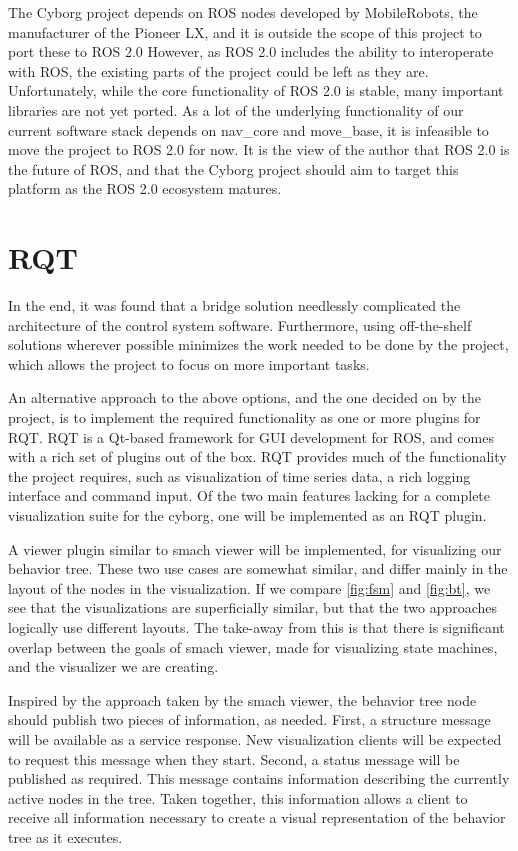 \documentclass[\rootfolder/main.tex]{subfiles}
\begin{document}
The Cyborg project depends on ROS nodes developed by MobileRobots, the manufacturer of the Pioneer LX, and it is outside the scope of this project to port these to ROS 2.0
However, as ROS 2.0 includes the ability to interoperate with ROS, the existing parts of the project could be left as they are.
Unfortunately, while the core functionality of ROS 2.0 is stable, many important libraries are not yet ported.
As a lot of the underlying functionality of our current software stack depends on nav\_core and move\_base, it is infeasible to move the project to ROS 2.0 for now.
It is the view of the author that ROS 2.0 is the future of ROS, and that the Cyborg project should aim to target this platform as the ROS 2.0 ecosystem matures.

\section{RQT}

In the end, it was found that a bridge solution needlessly complicated the architecture of the control system software.
Furthermore, using off-the-shelf solutions wherever possible minimizes the work needed to be done by the project, which allows the project to focus on more important tasks.

An alternative approach to the above options, and the one decided on by the project, is to implement the required functionality as one or more plugins for RQT.
RQT is a Qt-based framework for GUI development for ROS, and comes with a rich set of plugins out of the box.
RQT provides much of the functionality the project requires, such as visualization of time series data, a rich logging interface and command input.
Of the two main features lacking for a complete visualization suite for the cyborg, one will be implemented as an RQT plugin.

A viewer plugin similar to smach viewer will be implemented, for visualizing our behavior tree.
These two use cases are somewhat similar, and differ mainly in the layout of the nodes in the visualization.
If we compare \cref{fig:fsm} and \cref{fig:bt}, we see that the visualizations are superficially similar, but that the two approaches logically use different layouts.
The take-away from this is that there is significant overlap between the goals of smach viewer, made for visualizing state machines, and the visualizer we are creating.

Inspired by the approach taken by the smach viewer, the behavior tree node should publish two pieces of information, as needed.
First, a structure message will be available as a service response.
New visualization clients will be expected to request this message when they start.
Second, a status message will be published as required.
This message contains information describing the currently active nodes in the tree.
Taken together, this information allows a client to receive all information necessary to create a visual representation of the behavior tree as it executes.
\end{document}
